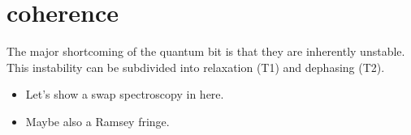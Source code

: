 \section{coherence}
The major shortcoming of the quantum bit is that they are inherently unstable.
This instability can be subdivided into relaxation (T1) and dephasing (T2).
\begin{itemize}
    \item Let's show a swap spectroscopy in here.
    \item Maybe also a Ramsey fringe.
\end{itemize}







